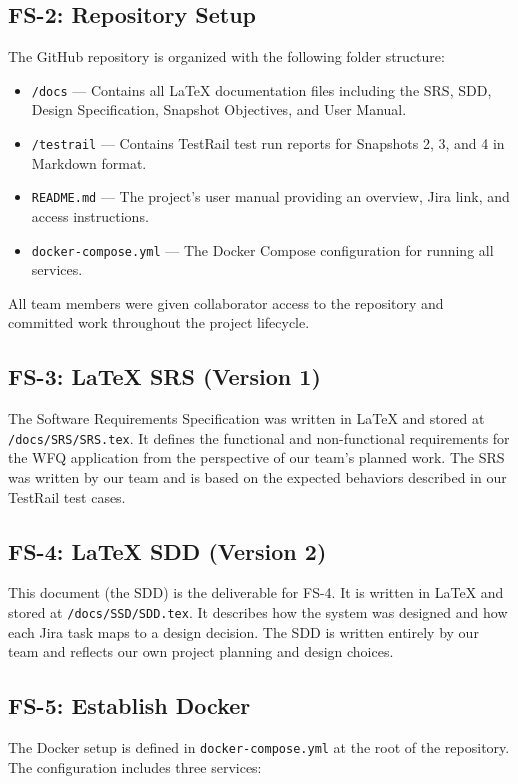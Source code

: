 \documentclass[12pt]{article}
\begin{document}
\subsection{FS-2: Repository Setup}
The GitHub repository is organized with the following folder structure:
 
\begin{itemize}
    \item \texttt{/docs} --- Contains all \LaTeX{} documentation files including the SRS,
    SDD, Design Specification, Snapshot Objectives, and User Manual.
    \item \texttt{/testrail} --- Contains TestRail test run reports for Snapshots 2, 3,
    and 4 in Markdown format.
    \item \texttt{README.md} --- The project's user manual providing an overview, Jira link,
    and access instructions.
    \item \texttt{docker-compose.yml} --- The Docker Compose configuration for running
    all services.
\end{itemize}
 
All team members were given collaborator access to the repository and committed work
throughout the project lifecycle.
 
\subsection{FS-3: LaTeX SRS (Version 1)}
The Software Requirements Specification was written in \LaTeX{} and stored at
\texttt{/docs/SRS/SRS.tex}. It defines the functional and non-functional requirements for
the WFQ application from the perspective of our team's planned work. The SRS was written
by our team and is based on the expected behaviors described in our TestRail test cases.
 
\subsection{FS-4: LaTeX SDD (Version 2)}
This document (the SDD) is the deliverable for FS-4. It is written in \LaTeX{} and stored
at \texttt{/docs/SSD/SDD.tex}. It describes how the system was designed and how each Jira
task maps to a design decision. The SDD is written entirely by our team and reflects our
own project planning and design choices.
 
\subsection{FS-5: Establish Docker}
The Docker setup is defined in \texttt{docker-compose.yml} at the root of the repository.
The configuration includes three services:
 
\end{document}
